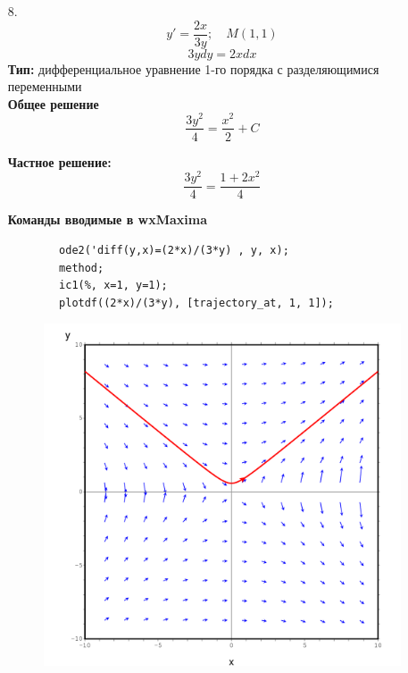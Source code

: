 \documentclass[a4paper, 12pt, oneside]{scrartcl}
\begin{document}
\begin{enumerate}
		\pagebreak
		\item[8.]
		$$y' = \frac{2x}{3y}; \quad M(1, 1)$$
		$$3ydy = 2xdx$$ 
		\textbf{Тип: }
		дифференциальное уравнение 1-го порядка с разделяющимися переменными \\

		\textbf{Общее решение}
		$$\frac{3y^2}{4} = \frac{x^2}{2} + C$$

		\textbf{Частное решение:}
		$$\frac{3y^2}{4} = \frac{1+2x^2}{4}$$

		\textbf{Команды вводимые в wxMaxima }
		\begin{verbatim}
		ode2('diff(y,x)=(2*x)/(3*y) , y, x);
		method;
		ic1(%, x=1, y=1);
		plotdf((2*x)/(3*y), [trajectory_at, 1, 1]);
		\end{verbatim}
		\begin{figure}[ht]
		\center\includegraphics[width=.5\linewidth]{./src/8_}
		\end{figure}

	\end{enumerate}
\end{document}
